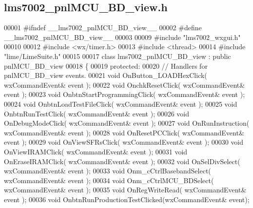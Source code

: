 \subsection{lms7002\+\_\+pnl\+M\+C\+U\+\_\+\+B\+D\+\_\+view.\+h}
\label{lms7002__pnlMCU__BD__view_8h_source}

\begin{DoxyCode}
00001 \textcolor{preprocessor}{#ifndef \_\_lms7002\_pnlMCU\_BD\_view\_\_}
00002 \textcolor{preprocessor}{#define \_\_lms7002\_pnlMCU\_BD\_view\_\_}
00003 
00009 \textcolor{preprocessor}{#include "lms7002_wxgui.h"}
00010 
00012 \textcolor{preprocessor}{#include <wx/timer.h>}
00013 \textcolor{preprocessor}{#include <thread>}
00014 \textcolor{preprocessor}{#include "lime/LimeSuite.h"}
00015 
00017 \textcolor{keyword}{class }lms7002_pnlMCU_BD_view : \textcolor{keyword}{public} pnlMCU_BD_view
00018 \{
00019     \textcolor{keyword}{protected}:
00020         \textcolor{comment}{// Handlers for pnlMCU\_BD\_view events.}
00021         \textcolor{keywordtype}{void} OnButton_LOADHexClick( wxCommandEvent& event );
00022         \textcolor{keywordtype}{void} OnchkResetClick( wxCommandEvent& event );
00023         \textcolor{keywordtype}{void} OnbtnStartProgrammingClick( wxCommandEvent& event );
00024         \textcolor{keywordtype}{void} OnbtnLoadTestFileClick( wxCommandEvent& event );
00025         \textcolor{keywordtype}{void} OnbtnRunTestClick( wxCommandEvent& event );
00026         \textcolor{keywordtype}{void} OnDebugModeClick( wxCommandEvent& event );
00027         \textcolor{keywordtype}{void} OnRunInstruction( wxCommandEvent& event );
00028         \textcolor{keywordtype}{void} OnResetPCClick( wxCommandEvent& event );
00029         \textcolor{keywordtype}{void} OnViewSFRsClick( wxCommandEvent& event );
00030         \textcolor{keywordtype}{void} OnViewIRAMClick( wxCommandEvent& event );
00031         \textcolor{keywordtype}{void} OnEraseIRAMClick( wxCommandEvent& event );
00032         \textcolor{keywordtype}{void} OnSelDivSelect( wxCommandEvent& event );
00033         \textcolor{keywordtype}{void} Onm_cCtrlBasebandSelect( wxCommandEvent& event );
00034         \textcolor{keywordtype}{void} Onm_cCtrlMCU_BDSelect( wxCommandEvent& event );
00035         \textcolor{keywordtype}{void} OnRegWriteRead( wxCommandEvent& event );
00036         \textcolor{keywordtype}{void} OnbtnRunProductionTestClicked(wxCommandEvent& event);

\end{DoxyCode}
